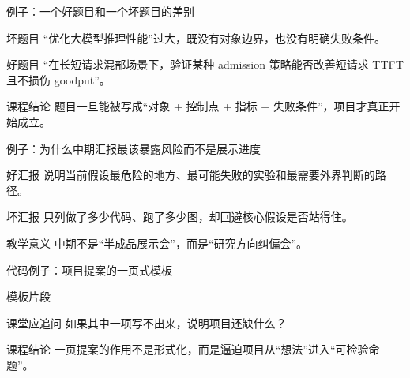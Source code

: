 \begin{frame}{例子：一个好题目和一个坏题目的差别}
  \begin{block}{坏题目}
    “优化大模型推理性能”过大，既没有对象边界，也没有明确失败条件。
  \end{block}
  \pause
  \begin{block}{好题目}
    “在长短请求混部场景下，验证某种 admission 策略能否改善短请求 TTFT 且不损伤 goodput”。
  \end{block}
  \pause
  \begin{block}{课程结论}
    题目一旦能被写成“对象 + 控制点 + 指标 + 失败条件”，项目才真正开始成立。
  \end{block}
\end{frame}

\begin{frame}{例子：为什么中期汇报最该暴露风险而不是展示进度}
  \begin{block}{好汇报}
    说明当前假设最危险的地方、最可能失败的实验和最需要外界判断的路径。
  \end{block}
  \pause
  \begin{block}{坏汇报}
    只列做了多少代码、跑了多少图，却回避核心假设是否站得住。
  \end{block}
  \pause
  \begin{block}{教学意义}
    中期不是“半成品展示会”，而是“研究方向纠偏会”。
  \end{block}
\end{frame}

\begin{frame}{代码例子：项目提案的一页式模板}
  \begin{block}{模板片段}
    {\ttfamily\small
    \par
    \par
    \par
    \par
    }
  \end{block}
  \pause
  \begin{block}{课堂应追问}
    如果其中一项写不出来，说明项目还缺什么？
  \end{block}
  \pause
  \begin{block}{课程结论}
    一页提案的作用不是形式化，而是逼迫项目从“想法”进入“可检验命题”。
  \end{block}
\end{frame}

